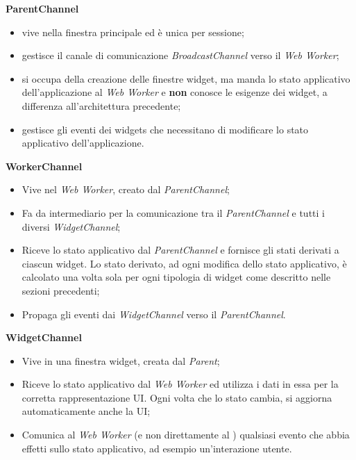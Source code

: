 \textbf{ParentChannel}
    \begin{itemize}
        \item vive nella finestra principale ed è unica per sessione;
        \item gestisce il canale di comunicazione \textit{BroadcastChannel} verso il \textit{Web Worker};
        \item si occupa della creazione delle finestre widget, ma manda lo stato applicativo dell'applicazione al \textit{Web Worker} e \textbf{non} conosce le esigenze dei widget, a differenza all'architettura precedente;
        \item gestisce gli eventi dei widgets che necessitano di modificare lo stato applicativo dell'applicazione.
    \end{itemize}
\textbf{WorkerChannel}
    \begin{itemize}
        \item Vive nel \textit{Web Worker}, creato dal \textit{ParentChannel};
        \item Fa da intermediario per la comunicazione tra il \textit{ParentChannel} e tutti i diversi \textit{WidgetChannel};
        \item Riceve lo stato applicativo dal \textit{ParentChannel} e fornisce gli stati derivati a ciascun widget. Lo stato derivato, ad ogni modifica dello stato applicativo, è calcolato una volta sola per ogni tipologia di widget come descritto nelle sezioni precedenti;
        \item Propaga gli eventi dai \textit{WidgetChannel} verso il \textit{ParentChannel}.
    \end{itemize}
\textbf{WidgetChannel}
    \begin{itemize}
        \item Vive in una finestra widget, creata dal \textit{Parent};
        \item Riceve lo stato applicativo dal \textit{Web Worker} ed utilizza i dati in essa per la corretta rappresentazione UI. Ogni volta che lo stato cambia, si aggiorna automaticamente anche la UI;
        \item Comunica al \textit{Web Worker} (e non direttamente al ) qualsiasi evento che abbia effetti sullo stato applicativo, ad esempio un'interazione utente.
    \end{itemize}

